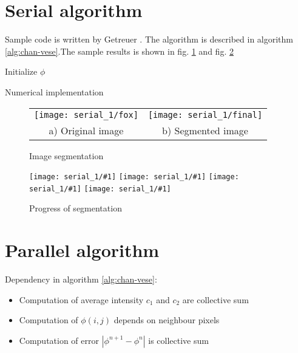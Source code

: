 \section{Serial algorithm}
Sample code is written by Getreuer \cite{Getreuer2012}. The algorithm is described in algorithm \ref{alg:chan-vese}.The sample results is shown in fig. \ref{fig:seg} and fig. \ref*{fig:prog}

\begin{algorithm}[hb]
    \DontPrintSemicolon
    Initialize $\phi$ \;

    \caption{Numerical implementation}
    \label{alg:chan-vese}
\end{algorithm}



\begin{figure}[ht]
    \centering
    \begin{tabular}{cc}
        \texttt{[image: serial\_1/fox]} & \texttt{[image: serial\_1/final]} \\
        \small a) Original image & \small b) Segmented image
    \end{tabular}
    \caption{Image segmentation}
    \label{fig:seg}
\end{figure}

\begin{figure}[!htb]
    \centering
    \newcommand{\imgFoxProg}[1]{\texttt{[image: serial\_1/\#1]}}
    \imgFoxProg{1} \imgFoxProg{2} \imgFoxProg{3} \imgFoxProg{4} 
    \caption{Progress of segmentation}
    \label{fig:prog}
\end{figure}

\section{Parallel algorithm}

Dependency in algorithm \ref{alg:chan-vese}:
\begin{itemize}
    \item Computation of average intensity $c_1$ and $c_2$ are collective sum
    \item Computation of $\phi(i, j)$ depends on neighbour pixels
    \item Computation of error $|\phi^{n+1} - \phi^n|$ is collective sum
\end{itemize}

